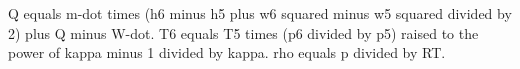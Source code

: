 Q equals m-dot times (h6 minus h5 plus w6 squared minus w5 squared divided by 2) plus Q minus W-dot.  
T6 equals T5 times (p6 divided by p5) raised to the power of kappa minus 1 divided by kappa.  
rho equals p divided by RT.